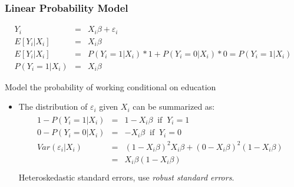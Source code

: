 \documentclass[pdftex]{beamer}
\begin{document}
\begin{frame}
\frametitle{Linear Probability Model}

\begin{eqnarray*}
  Y_i &=& X_i \beta + \varepsilon_i \\
  E[Y_i|X_i] &=& X_i \beta \\
  E[Y_i|X_i] &=& P(Y_i=1|X_i)\ast 1 + P(Y_i=0|X_i)\ast 0 = P(Y_i=1|X_i)\\
  P(Y_i=1|X_i) &=& X_i \beta
\end{eqnarray*}

Model the probability of working conditional on education
\begin{itemize}
  \item The distribution of $\varepsilon_i$ given $X_i$ can be summarized as:
 \begin{eqnarray*}
 \begin{array}{ccccc}
                                                1- P(Y_i=1|X_i) &=& 1-X_i \beta\;\;  \text{if}\;\; Y_i=1  \\
                                                0- P(Y_i=0|X_i) &=&    -X_i \beta \;\; \text{if}\;\; Y_i=0\\
                                                                        Var(\varepsilon_i|X_i)&=&(1-X_i \beta )^2 X_i \beta+(0-X_i \beta)^2(1-X_i \beta)\\
                         
                                                                        &=&X_i \beta (1-X_i \beta)\\

                                                 \end{array} 
\end{eqnarray*}
Heteroskedastic standard errors,  use \emph{robust standard errors}.

\end{itemize}
\end{frame}
\end{document}
